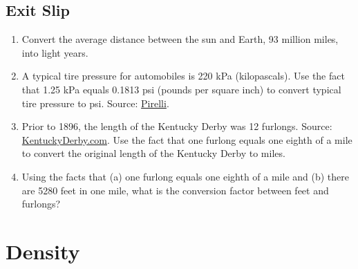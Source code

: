 \subsection{Exit Slip}
\begin{enumerate}
\item Convert the average distance between the sun and Earth, 93 million miles, into light years.\wbvfill
\item A typical tire pressure for automobiles is 220 kPa (kilopascals). Use the fact that 1.25 kPa equals 0.1813 psi (pounds per square inch) to convert typical tire pressure to psi. Source: \href{https://www.pirelli.com/tires/en-us/car/driving-and-tire-tips/how-to-read/recommended-tire-pressure}{Pirelli}.\wbvfill
\item Prior to 1896, the length of the Kentucky Derby was 12 furlongs. Source: \href{https://www.kentuckyderby.com/history/kentucky-derby-history}{KentuckyDerby.com}. Use the fact that one furlong equals one eighth of a mile to convert the original length of the Kentucky Derby to miles.\wbvfill
\item Using the facts that (a) one furlong equals one eighth of a mile and (b) there are 5280 feet in one mile, what is the conversion factor between feet and furlongs?\wbvfill
\end{enumerate}\wbnewpage


\iffalse

\section{Density}\label{sec:proportions}

